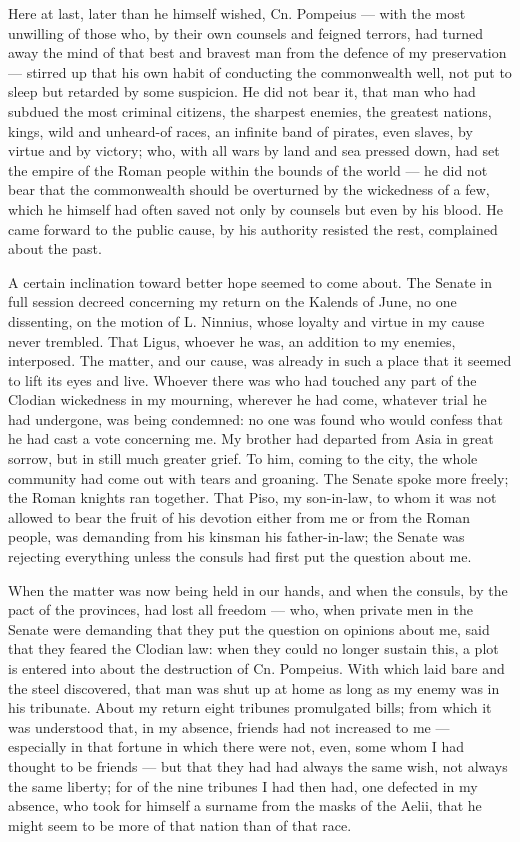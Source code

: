  Here at last, later than he himself wished, Cn. Pompeius --- with the most unwilling of those who, by their own counsels and feigned terrors, had turned away the mind of that best and bravest man from the defence of my preservation --- stirred up that his own habit of conducting the commonwealth well, not put to sleep but retarded by some suspicion. He did not bear it, that man who had subdued the most criminal citizens, the sharpest enemies, the greatest nations, kings, wild and unheard-of races, an infinite band of pirates, even slaves, by virtue and by victory; who, with all wars by land and sea pressed down, had set the empire of the Roman people within the bounds of the world --- he did not bear that the commonwealth should be overturned by the wickedness of a few, which he himself had often saved not only by counsels but even by his blood. He came forward to the public cause, by his authority resisted the rest, complained about the past.

 A certain inclination toward better hope seemed to come about. The Senate in full session decreed concerning my return on the Kalends of June, no one dissenting, on the motion of L. Ninnius, whose loyalty and virtue in my cause never trembled. That Ligus, whoever he was, an addition to my enemies, interposed. The matter, and our cause, was already in such a place that it seemed to lift its eyes and live. Whoever there was who had touched any part of the Clodian wickedness in my mourning, wherever he had come, whatever trial he had undergone, was being condemned: no one was found who would confess that he had cast a vote concerning me. My brother had departed from Asia in great sorrow, but in still much greater grief. To him, coming to the city, the whole community had come out with tears and groaning. The Senate spoke more freely; the Roman knights ran together. That Piso, my son-in-law, to whom it was not allowed to bear the fruit of his devotion either from me or from the Roman people, was demanding from his kinsman his father-in-law; the Senate was rejecting everything unless the consuls had first put the question about me.

 When the matter was now being held in our hands, and when the consuls, by the pact of the provinces, had lost all freedom --- who, when private men in the Senate were demanding that they put the question on opinions about me, said that they feared the Clodian law: when they could no longer sustain this, a plot is entered into about the destruction of Cn. Pompeius. With which laid bare and the steel discovered, that man was shut up at home as long as my enemy was in his tribunate. About my return eight tribunes promulgated bills; from which it was understood that, in my absence, friends had not increased to me --- especially in that fortune in which there were not, even, some whom I had thought to be friends --- but that they had had always the same wish, not always the same liberty; for of the nine tribunes I had then had, one defected in my absence, who took for himself a surname from the masks of the Aelii, that he might seem to be more of that nation than of that race.

